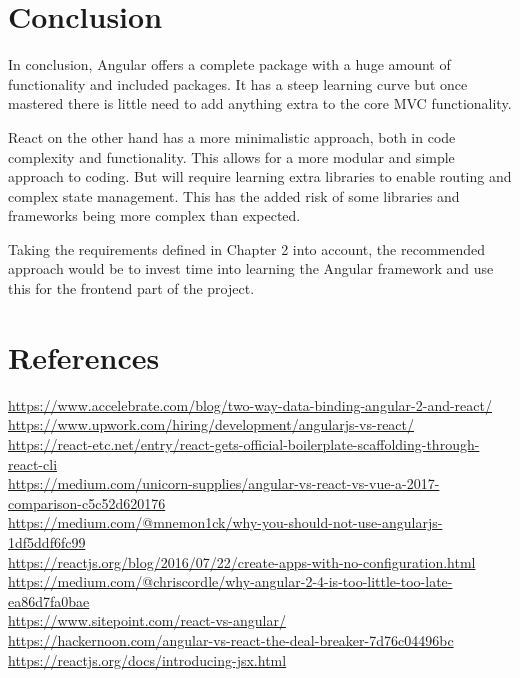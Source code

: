 \documentclass{report}
\begin{document}
	\chapter{Conclusion}
	In conclusion, Angular offers a complete package with a huge amount of functionality and included packages. It has a steep learning curve but once mastered there is little need to add anything extra to the core MVC functionality. 
	
	React on the other hand has a more minimalistic approach, both in code complexity and functionality. This allows for a more modular and simple approach to coding. But will require learning extra libraries to enable routing and complex state management. This has the added risk of some libraries and frameworks being more complex than expected.
	
	Taking the requirements defined in Chapter 2 into account, the recommended approach would be to invest time into learning the Angular framework and use this for the frontend part of the project.
	
	\chapter{References}
	\url{https://www.accelebrate.com/blog/two-way-data-binding-angular-2-and-react/}\\
	\url{https://www.upwork.com/hiring/development/angularjs-vs-react/}\\
	\url{https://react-etc.net/entry/react-gets-official-boilerplate-scaffolding-through-react-cli}\\
	\url{https://medium.com/unicorn-supplies/angular-vs-react-vs-vue-a-2017-comparison-c5c52d620176}\\
	\url{https://medium.com/@mnemon1ck/why-you-should-not-use-angularjs-1df5ddf6fc99} \\
	\url{https://reactjs.org/blog/2016/07/22/create-apps-with-no-configuration.html} \\
	\url{https://medium.com/@chriscordle/why-angular-2-4-is-too-little-too-late-ea86d7fa0bae} \\
	\url{https://www.sitepoint.com/react-vs-angular/} \\
	\url{https://hackernoon.com/angular-vs-react-the-deal-breaker-7d76c04496bc} \\
	\url{https://reactjs.org/docs/introducing-jsx.html}
	
\end{document}
